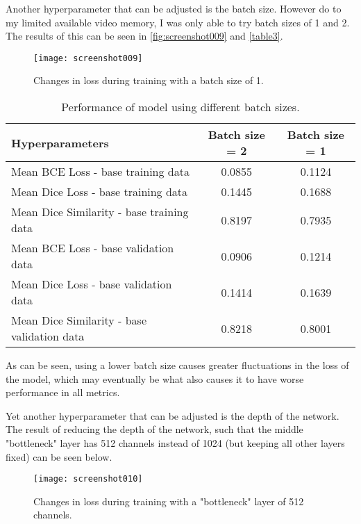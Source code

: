 \documentclass[a4paper, 12pt]{article}
\begin{document}
Another hyperparameter that can be adjusted is the batch size. However do to my limited available video memory, I was only able to try batch sizes of 1 and 2. The results of this can be seen in \autoref{fig:screenshot009} and \autoref{table3}.

\begin{figure}
	\centering
	\texttt{[image: screenshot009]}
	\caption{Changes in loss during training with a batch size of 1.}
	\label{fig:screenshot009}
\end{figure}

\begin{table}[H]
	\centering
	\begin{tabular}{|l||c|c|}
		\hline
		Hyperparameters & Batch size = 2 & Batch size = 1\\
		\hline\hline
		Mean BCE Loss - base training data & 0.0855 & 0.1124\\
		\hline
		Mean Dice Loss - base training data & 0.1445 & 0.1688\\
		\hline
		Mean Dice Similarity - base training data & 0.8197 &  0.7935\\
		\hline\hline
		Mean BCE Loss - base validation data & 0.0906 & 0.1214\\
		\hline
		Mean Dice Loss - base validation data & 0.1414 & 0.1639\\
		\hline
		Mean Dice Similarity - base validation data & 0.8218 & 0.8001\\
		\hline
	\end{tabular}
	\caption{Performance of model using different batch sizes.}
	\label{table3}
\end{table}

As can be seen, using a lower batch size causes greater fluctuations in the loss of the model, which may eventually be what also causes it to have worse performance in all metrics.

Yet another hyperparameter that can be adjusted is the depth of the network. The result of reducing the depth of the network, such that the middle "bottleneck" layer has 512 channels instead of 1024 (but keeping all other layers fixed) can be seen below.


\begin{figure}[H]
	\centering
	\texttt{[image: screenshot010]}
	\caption{Changes in loss during training with a "bottleneck" layer of 512 channels.}
	\label{fig:screenshot010}
\end{figure}
\end{document}
